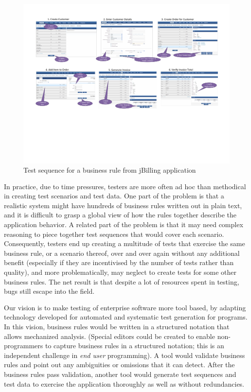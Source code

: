 \begin{figure}
\centering
\includegraphics[trim=0 200 0 50,clip,width=7.5in]{figs/jbilling-flow}
\caption{Test sequence for a business rule from jBilling application}
\label{fig:jbilling-flow}
\end{figure}

In practice, due to time pressures, testers are more often ad hoc than methodical in creating test 
scenarios and test data.  One part of the problem is that a realistic system might have hundreds of 
business rules written out in plain text, and it is difficult to grasp a global view of how the rules 
together describe the application behavior.  A related part of the problem is that it may need complex 
reasoning to piece together test sequences that would cover each scenario. Consequently, testers end up 
creating a multitude of tests that exercise the same business rule, or a scenario thereof, over and over 
again without any additional benefit (especially if they are incentivised by the number of tests rather than 
quality), and more problematically, may neglect to create tests for some other business rules.  The net 
result is that despite a lot of resources spent in testing, bugs still escape into the field.

Our vision is to make testing of enterprise software more tool based, by adapting technology developed 
for automated and systematic test generation for programs.   In this vision, business rules would be 
written in a structured notation that allows mechanized analysis. 
(Special editors could be created to enable non-programmers to capture business rules in a structured notation; 
this is an independent challenge in \textit{end user} programming).  A tool would validate business rules 
and point out any ambiguities or omissions that it can detect.  After the business rules pass validation, 
another tool would generate test sequences and test data to exercise the application thoroughly as well as
without redundancies.

